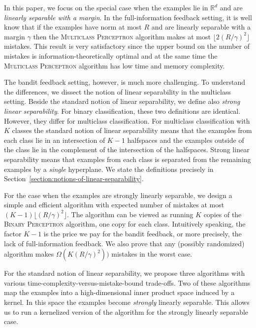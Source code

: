 \documentclass[12pt]{article}
\newcommand{\R}{\mathbb{R}}  %
\begin{document}
In this paper, we focus on the special case when the examples lie in $\R^d$ and
are \emph{linearly separable with a margin}. In the full-information feedback
setting, it is well know that if the examples have norm at most $R$ and are
linearly separable with a margin $\gamma$ then the \textsc{Multiclass
Perceptron} algorithm makes at most $\lfloor 2(R/\gamma)^2 \rfloor$ mistakes.
This result is very satisfactory since the upper bound on the number of mistakes
is information-theoretically optimal and at the same time the \textsc{Multiclass
Perceptron} algorithm has low time and memory complexity.

The bandit feedback setting, however, is much more challenging. To understand
the differences, we dissect the notion of linear separability in the multiclass
setting. Beside the standard notion of linear separability, we define also
\emph{strong linear separability}. For binary classification, these two
definitions are identical. However, they differ for multiclass classification.
For multiclass classification with $K$ classes the standard notion of linear
separability means that the examples from each class lie in an intersection of
$K-1$ halfspaces and the examples outside of the class lie in the complement of
the intersection of the halfspaces. Strong linear separability means that
examples from each class is separated from the remaining examples by a
\emph{single} hyperplane. We state the definitions precisely in
Section~\ref{section:notions-of-linear-separability}.

For the case when the examples are strongly linearly separable, we design a
simple and efficient algorithm with expected number of mistakes at most $(K-1)
\lfloor (R/\gamma)^2 \rfloor$. The algorithm can be viewed as running $K$ copies
of the \textsc{Binary Perceptron} algorithm, one copy for each class.
Intuitively speaking, the factor $K-1$ is the price we pay for the bandit
feedback, or more precisely, the lack of full-information feedback. We also
prove that any (possibly randomized) algorithm makes $\Omega(K (R/\gamma)^2))$
mistakes in the worst case.

For the standard notion of linear separability, we propose three algorithms with
various time-complexity-versus-mistake-bound trade-offs. Two of these algorithms
map the examples into a high-dimensional inner product space induced by a
kernel. In this space the examples become \emph{strongly} linearly separable.
This allows us to run a kernelized version of the algorithm for the strongly
linearly separable case.
\end{document}
